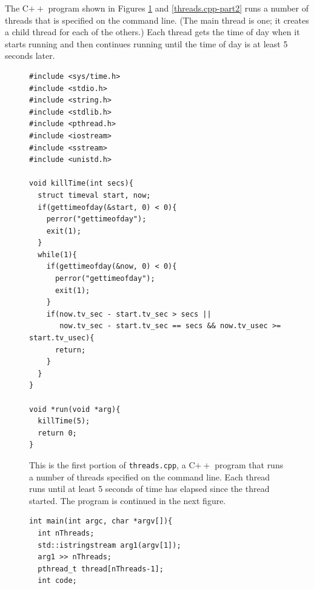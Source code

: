 \begin{chapterEnumerate}
The C$++$ program shown in Figures \ref{threads.cpp-part1} and \ref{threads.cpp-part2} runs a number of threads that is specified on the command line.  (The main thread is one; it creates a child thread for each of the others.)  Each thread gets the time of day when it starts running and then continues running until the time of day is at least 5 seconds later.
\begin{figure}
\begin{verbatim}
#include <sys/time.h>
#include <stdio.h>
#include <string.h>
#include <stdlib.h>
#include <pthread.h>
#include <iostream>
#include <sstream>
#include <unistd.h>

void killTime(int secs){
  struct timeval start, now;
  if(gettimeofday(&start, 0) < 0){
    perror("gettimeofday");
    exit(1);
  }
  while(1){
    if(gettimeofday(&now, 0) < 0){
      perror("gettimeofday");
      exit(1);
    }
    if(now.tv_sec - start.tv_sec > secs ||
       now.tv_sec - start.tv_sec == secs && now.tv_usec >= start.tv_usec){
      return;
    }
  }
}

void *run(void *arg){
  killTime(5);
  return 0;
}
\end{verbatim}
\caption{This is the first portion of \texttt{threads.cpp}, a C$++$ program that runs a number of threads specified on the command line.  Each thread runs until at least 5 seconds of time has elapsed since the thread started.  The program is continued in the next figure.}\label{threads.cpp-part1}
\end{figure}
\begin{figure}
\begin{verbatim}
int main(int argc, char *argv[]){
  int nThreads;
  std::istringstream arg1(argv[1]);
  arg1 >> nThreads;
  pthread_t thread[nThreads-1];
  int code;


\end{verbatim}
\end{figure}
\end{chapterEnumerate}
